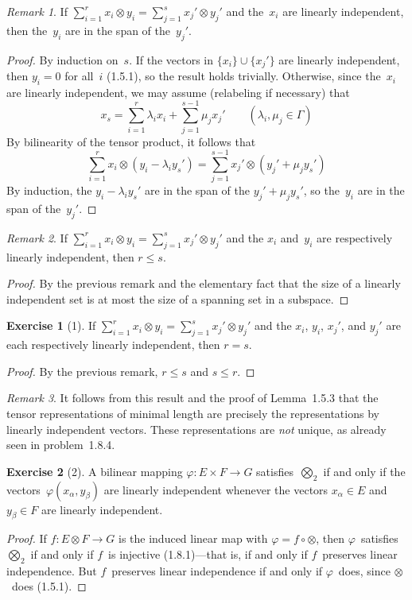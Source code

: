 \documentclass[letterpaper,12pt]{article}
\newcommand{\union}{\cup}
\newcommand{\after}{\circ}
\newcommand{\tprod}{\otimes}
\newcommand{\bigtprod}{\bigotimes}
\newcommand{\medtprod}{{\textstyle\bigtprod}}
\theoremstyle{definition}
\newtheorem*{exer}{Exercise}
\theoremstyle{remark}
\newtheorem*{rmk}{Remark}
\begin{document}
\begin{rmk}
If \(\sum_{i=1}^r x_i\tprod y_i=\sum_{j=1}^s x_j'\tprod y_j'\) and the~\(x_i\) are linearly independent, then the~\(y_i\) are in the span of the~\(y_j'\).
\end{rmk}
\begin{proof}
By induction on~\(s\). If the vectors in \(\{x_i\}\union\{x_j'\}\) are linearly independent, then \(y_i=0\) for all~\(i\) (1.5.1), so the result holds trivially. Otherwise, since the~\(x_i\) are linearly independent, we may assume (relabeling if necessary) that
\[x_s=\sum_{i=1}^r\lambda_i x_i+\sum_{j=1}^{s-1}\mu_j x_j'\qquad(\lambda_i,\mu_j\in\Gamma)\]
By bilinearity of the tensor product, it follows that
\[\sum_{i=1}^r x_i\tprod(y_i-\lambda_i y_s')=\sum_{j=1}^{s-1}x_j'\tprod(y_j'+\mu_j y_s')\]
By induction, the \(y_i-\lambda_iy_s'\) are in the span of the \(y_j'+\mu_jy_s'\), so the~\(y_i\) are in the span of the~\(y_j'\).
\end{proof}

\begin{rmk}
If \(\sum_{i=1}^r x_i\tprod y_i=\sum_{j=1}^s x_j'\tprod y_j'\) and the \(x_i\) and~\(y_i\) are respectively linearly independent, then \(r\le s\).
\end{rmk}
\begin{proof}
By the previous remark and the elementary fact that the size of a linearly independent set is at most the size of a spanning set in a subspace.
\end{proof}

\begin{exer}[1]
If \(\sum_{i=1}^r x_i\tprod y_i=\sum_{j=1}^s x_j'\tprod y_j'\) and the \(x_i\), \(y_i\), \(x_j'\), and \(y_j'\) are each respectively linearly independent, then \(r=s\).
\end{exer}
\begin{proof}
By the previous remark, \(r\le s\) and \(s\le r\).
\end{proof}
\begin{rmk}
It follows from this result and the proof of Lemma~1.5.3 that the tensor representations of minimal length are precisely the representations by linearly independent vectors. These representations are \emph{not} unique, as already seen in problem~1.8.4.
\end{rmk}

\begin{exer}[2]
A bilinear mapping \(\varphi:E\times F\to G\) satisfies~\(\medtprod_2\) if and only if the vectors~\(\varphi(x_{\alpha},y_{\beta})\) are linearly independent whenever the vectors \(x_{\alpha}\in E\) and \(y_{\beta}\in F\) are linearly independent.
\end{exer}
\begin{proof}
If \(f:E\tprod F\to G\) is the induced linear map with \(\varphi=f\after\tprod\), then \(\varphi\)~satisfies \(\medtprod_2\) if and only if \(f\)~is injective (1.8.1)---that is, if and only if \(f\)~preserves linear independence. But \(f\)~preserves linear independence if and only if \(\varphi\)~does, since \(\tprod\)~does (1.5.1).
\end{proof}
\end{document}
